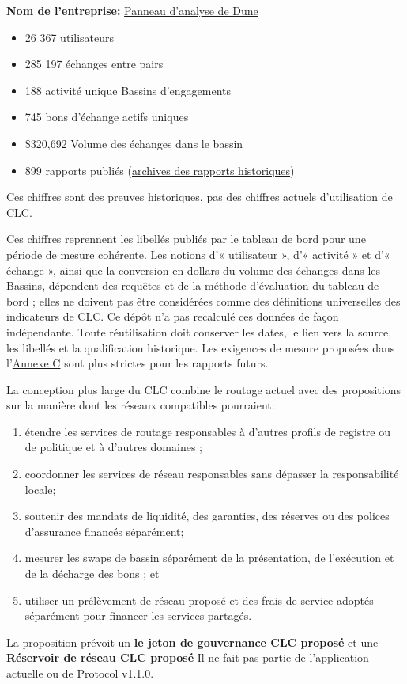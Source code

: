 \documentclass[11pt]{article}
\begin{document}
\textbf{Nom de l'entreprise:} \href{https://dune.com/grassrootseconomics/sarafu-network}{Panneau d'analyse de Dune}

\begin{itemize}[leftmargin=*]
\item 26 367 utilisateurs
\item 285 197 échanges entre pairs
\item 188 activité unique Bassins d'engagements
\item 745 bons d'échange actifs uniques
\item \$320,692 Volume des échanges dans le bassin
\item 899 rapports publiés (\href{https://sarafu.network/reports}{archives des rapports historiques})
\end{itemize}
Ces chiffres sont des preuves historiques, pas des chiffres actuels d'utilisation de CLC.

Ces chiffres reprennent les libellés publiés par le tableau de bord pour une période de mesure cohérente. Les notions d'« utilisateur », d'« activité » et d'« échange », ainsi que la conversion en dollars du volume des échanges dans les Bassins, dépendent des requêtes et de la méthode d'évaluation du tableau de bord ; elles ne doivent pas être considérées comme des définitions universelles des indicateurs de CLC. Ce dépôt n'a pas recalculé ces données de façon indépendante. Toute réutilisation doit conserver les dates, le lien vers la source, les libellés et la qualification historique. Les exigences de mesure proposées dans l'\href{https://docs.cosmolocal.credit/fr/white-paper/appendix-c-kpi-definitions}{Annexe C} sont plus strictes pour les rapports futurs.

La conception plus large du CLC combine le routage actuel avec des propositions sur la manière dont les réseaux compatibles pourraient:

\begin{enumerate}[leftmargin=*]
\item étendre les services de routage responsables à d'autres profils de registre ou de politique et à d'autres domaines ;
\item coordonner les services de réseau responsables sans dépasser la responsabilité locale;
\item soutenir des mandats de liquidité, des garanties, des réserves ou des polices d'assurance financés séparément;
\item mesurer les swaps de bassin séparément de la présentation, de l'exécution et de la décharge des bons ; et
\item utiliser un prélèvement de réseau proposé et des frais de service adoptés séparément pour financer les services partagés.
\end{enumerate}
La proposition prévoit un \textbf{le jeton de gouvernance CLC proposé } et une \textbf{ Réservoir de réseau CLC proposé} Il ne fait pas partie de l'application actuelle ou de Protocol v1.1.0.
\end{document}
